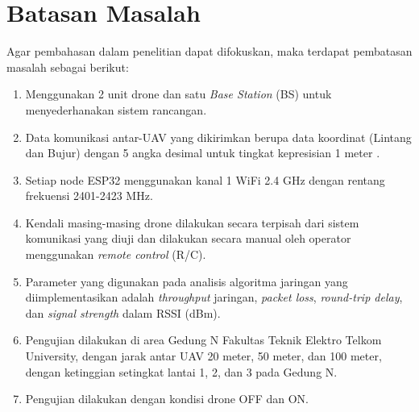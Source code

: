 \section{Batasan Masalah}
Agar pembahasan dalam penelitian dapat difokuskan, maka terdapat pembatasan masalah sebagai berikut:
\begin{enumerate}
	\item Menggunakan 2 unit drone dan satu \textit{Base Station} (BS) untuk menyederhanakan sistem rancangan.
	\item Data komunikasi antar-UAV yang dikirimkan berupa data koordinat (Lintang dan Bujur) dengan 5 angka desimal untuk tingkat kepresisian 1 meter \cite{PrecisionCoordinatesOpenStreetMap}.
	\item Setiap node ESP32 menggunakan kanal 1 WiFi 2.4 GHz dengan rentang frekuensi 2401-2423 MHz.
	\item Kendali masing-masing drone dilakukan secara terpisah dari sistem komunikasi yang diuji dan dilakukan secara manual oleh operator menggunakan \textit{remote control} (R/C).
	\item Parameter yang digunakan pada analisis algoritma jaringan yang diimplementasikan adalah \textit{throughput} jaringan, \textit{packet loss},  \textit{round-trip delay}, dan \textit{signal strength} dalam RSSI (dBm).
	\item Pengujian dilakukan di area Gedung N Fakultas Teknik Elektro Telkom University, dengan jarak antar UAV 20 meter, 50 meter, dan 100 meter, dengan ketinggian setingkat lantai 1, 2, dan 3 pada Gedung N.
	\item Pengujian dilakukan dengan kondisi drone OFF dan ON.
\end{enumerate}

